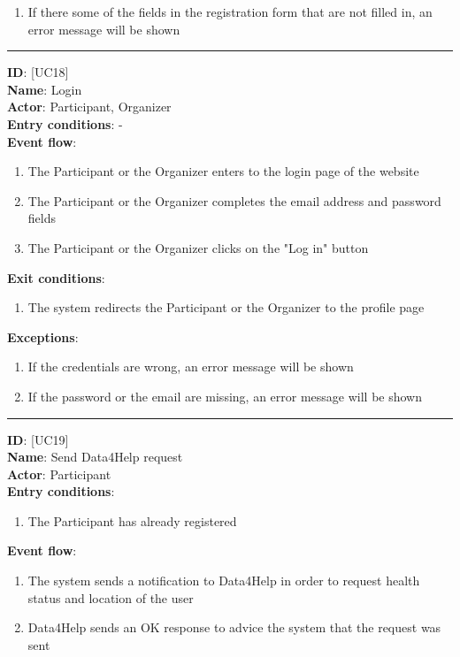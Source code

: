 \documentclass[a4paper, hidelinks, 12pt]{report}
\newcommand\usecase[1]{ [UC#1] }
\begin{document}
\begin{itemize}
\begin{enumerate}
			\item{If there some of the fields in the registration form that are not filled in, an error message will be shown}
		\end{enumerate}
		\rule{\linewidth}{0.4pt}
		\textbf{ID}: \usecase{18} \\
		\textbf{Name}: Login \\
		\textbf{Actor}: Participant, Organizer \\
		\textbf{Entry conditions}: - \\
		\textbf{Event flow}:
		\begin{enumerate}
			\item{The Participant or the Organizer enters to the login page of the website}
			\item{The Participant or the Organizer completes the email address and password fields}
			\item{The Participant or the Organizer clicks on the "Log in" button}
		\end{enumerate}
		\textbf{Exit conditions}:
		\begin{enumerate}
			\item{The system redirects the Participant or the Organizer to the profile page}
		\end{enumerate}
		\textbf{Exceptions}:
		\begin{enumerate}
			\item{If the credentials are wrong, an error message will be shown}
			\item{If the password or the email are missing, an error message will be shown}
		\end{enumerate}
		\rule{\linewidth}{0.4pt}
		\textbf{ID}: \usecase{19} \\
		\textbf{Name}: Send Data4Help request \\
		\textbf{Actor}: Participant \\
		\textbf{Entry conditions}:
		\begin{enumerate}
			\item{The Participant has already registered}
		\end{enumerate}
		\textbf{Event flow}:
		\begin{enumerate}
			\item{The system sends a notification to Data4Help in order to request health status and location of the user}
			\item{Data4Help sends an OK response to advice the system that the request was sent}
		\end{enumerate}

\end{itemize}
\end{document}
